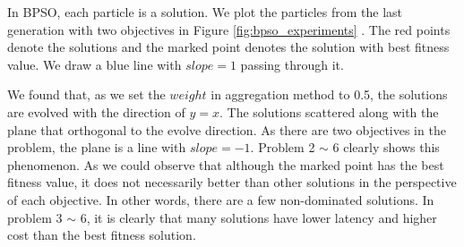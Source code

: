 In BPSO, each particle is a solution. We plot the particles from the last
generation with two objectives in Figure \ref{fig:bpso_experiments} . The red points denote the solutions and the marked point denotes the solution with best fitness value. We draw a blue line with $slope = 1 $ passing through it.

We found that, as we set the $weight$ in aggregation method to 0.5, the solutions are evolved
with the direction of $y = x$. 
The solutions scattered along with the plane that orthogonal to the evolve direction. As there are two objectives in the problem, the plane is a line with $slope = -1$. Problem 2 $\sim$ 6 clearly shows this phenomenon. As we could observe that although the marked point has the best
fitness value, it does not necessarily better than other solutions in the perspective of each objective.
In other words, there are a few non-dominated solutions.
In problem 3 $\sim$ 6, it is clearly that many solutions have lower latency and higher cost than the best fitness solution. 

